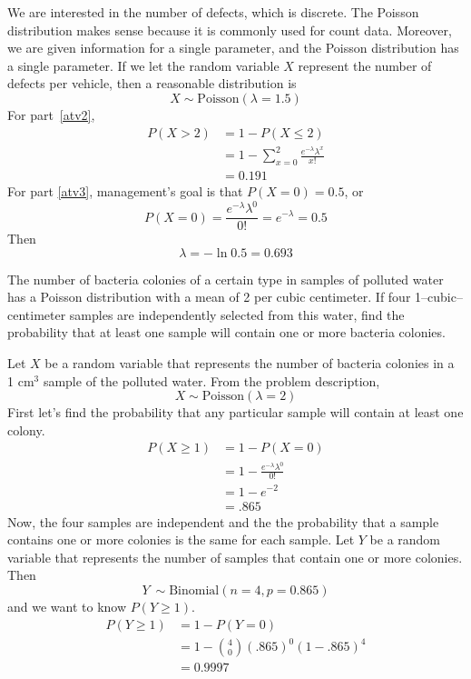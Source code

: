 We are interested in the number of defects, which is discrete.
The Poisson distribution makes sense because it is commonly used
for count data. Moreover, we are given information for a single
parameter, and the Poisson distribution has a single parameter.
If we let the random variable $X$ represent the number of defects
per vehicle, then a reasonable distribution is
\[ X \sim \text{Poisson}(\lambda=1.5) \]
For part~\ref{atv2},
\begin{align*}
P(X>2) &= 1 - P(X \leq 2)\\
       &= 1 - \sum_{x=0}^2 \frac{e^{-\lambda}\lambda^x}{x!}\\
       &= 0.191
\end{align*}
For part \ref{atv3}, management's goal is that $P(X=0)=0.5$, or
\[ P(X=0) = \frac{e^{-\lambda}\lambda^0}{0!} = e^{-\lambda}=0.5 \]
Then
\[ \lambda = -\ln{0.5} = 0.693 \]

The number of bacteria colonies of a certain type in samples of
polluted water has a Poisson distribution with a mean of 2 per cubic
centimeter. If four 1--cubic--centimeter samples are independently
selected from this water, find the probability that at least one
sample will contain one or more bacteria colonies.

Let $X$ be a random variable that represents the number of bacteria
colonies in a 1 cm$^3$ sample of the polluted water. From the problem
description,
\[ X \sim \text{Poisson}(\lambda = 2) \]
First let's find the probability that any particular sample will contain
at least one colony.
\begin{align*}
  P(X \geq 1) &= 1 - P(X=0)\\
              &= 1 - \frac{e^{-\lambda}\lambda^0}{0!}\\
              &= 1 - e^{-2}\\
  &= .865
\end{align*}
Now, the four samples are independent and the the probability that
a sample contains one or more colonies is the same for each sample.
Let $Y$ be a random variable that represents the number of samples
that contain one or more colonies. Then
\[ Y ~ \sim \text{Binomial}(n=4, p=0.865) \]
and we want to know $P(Y \geq 1)$.
\begin{align*}
  P(Y \geq 1) &= 1 - P(Y = 0)\\
              &= 1 - {4 \choose 0} (.865)^0 (1 - .865)^4 \\
  &= 0.9997
\end{align*}

